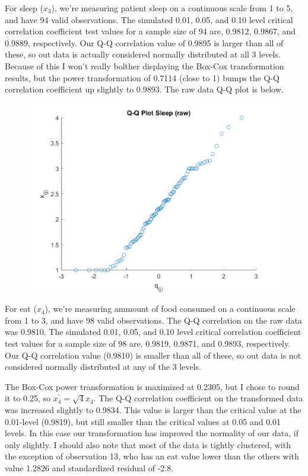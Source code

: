 For sleep ($x_{3}$), we're measuring patient sleep on a continuous scale from 1 to 5, and have 94 valid observations. The simulated 0.01, 0.05, and 0.10 level critical correlation coefficient test values for a sample size of 94 are, 0.9812, 0.9867, and 0.9889, respectively. Our Q-Q correlation value of 0.9895 is larger than all of these, so out data is actually considered normally distributed at all 3 levels. Because of this I won't really bolther displaying the Box-Cox transformation results, but the power transformation of 0.7114 (close to 1) bumps the Q-Q correlation coefficient up slightly to 0.9893. The raw data Q-Q plot is below.

\begin{center}
    \begin{figure}[H]
        \centering
        \includegraphics[scale=0.6]{./matlab/chapter-4/sol4.32.qq.3.png}
    \end{figure}
\end{center}

For eat ($x_{4}$), we're measuring ammount of food consumed on a continuous scale from 1 to 3, and have 98 valid observations. The Q-Q correlation on the raw data was 0.9810. The simulated 0.01, 0.05, and 0.10 level critical correlation coefficient test values for a sample size of 98 are, 0.9819, 0.9871, and 0.9893, respectively. Our Q-Q correlation value (0.9810) is smaller than all of these, so out data is not considered normally distributed at any of the 3 levels.

The Box-Cox power transformation is maximized at 0.2305, but I chose to round it to 0.25, so $x_{4}^{\prime} = \sqrt{4}{x_{4}}$. The Q-Q correlation coefficient on the transformed data was increased slightly to 0.9834. This value is larger than the critical value at the 0.01-level (0.9819), but still smaller than the critical values at 0.05 and 0.01 levels. In this case our transformation has improved the normality of our data, if only slightly. I should also note that most of the data is tightly clustered, with the exception of observation 13, who has an eat value lower than the others with value 1.2826 and standardized residual of -2.8.

